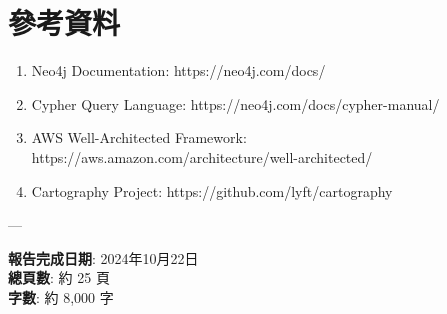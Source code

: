\documentclass[11pt,a4paper]{ctexart}
\begin{document}
\section{參考資料}

\begin{enumerate}[leftmargin=1.5em]
\item Neo4j Documentation: https://neo4j.com/docs/
\item Cypher Query Language: https://neo4j.com/docs/cypher-manual/
\item AWS Well-Architected Framework: https://aws.amazon.com/architecture/well-architected/
\item Cartography Project: https://github.com/lyft/cartography
\end{enumerate}

---

\textbf{報告完成日期}: 2024年10月22日 \\
\textbf{總頁數}: 約 25 頁 \\
\textbf{字數}: 約 8,000 字
\end{document}
